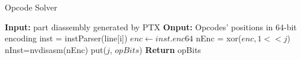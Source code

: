 \begin{algorithm}[htbp]
      \caption{Opcode Solver}\label{algo:opcode}
  \begin{algorithmic}[1]
      \State \textbf {Input:} part diassembly generated by PTX
      \State \textbf {Onput:} Opcodes' positions in 64-bit encoding
      \State inst = instParser(line[i])
      \State $enc \gets inst.enc64$
      \State nEnc = xor($enc, 1<<j$)
      \State nInst=nvdisasm(nEnc)
      \State put($j$, $opBits$)
      \EndIf
      \EndFor
      \EndFor
      \State \textbf{Return} opBits %
  \end{algorithmic}
\end{algorithm}

